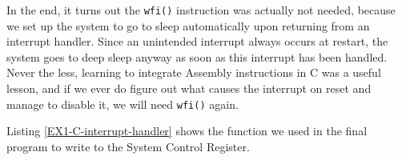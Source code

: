 In the end, it turns out the \texttt{wfi()} instruction was actually not needed, because we set up the system to go to sleep automatically upon returning from an interrupt handler. Since an unintended interrupt always occurs at restart, the system goes to deep sleep anyway as soon as this interrupt has been handled. Never the less, learning to integrate Assembly instructions in C was a useful lesson, and if we ever do figure out what causes the interrupt on reset and manage to disable it, we will need \texttt{wfi()} again.

Listing \ref{EX1-C-interrupt-handler} shows the function we used in the final program to write to the System Control Register.

